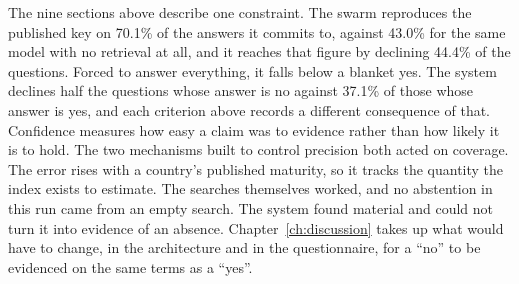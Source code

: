 The nine sections above describe one constraint. The swarm reproduces the published key on 70.1\% of the answers it commits to, against 43.0\% for the same model with no retrieval at all, and it reaches that figure by declining 44.4\% of the questions. Forced to answer everything, it falls below a blanket yes. The system declines half the questions whose answer is no against 37.1\% of those whose answer is yes, and each criterion above records a different consequence of that. Confidence measures how easy a claim was to evidence rather than how likely it is to hold. The two mechanisms built to control precision both acted on coverage. The error rises with a country's published maturity, so it tracks the quantity the index exists to estimate. The searches themselves worked, and no abstention in this run came from an empty search. The system found material and could not turn it into evidence of an absence. Chapter~\ref{ch:discussion} takes up what would have to change, in the architecture and in the questionnaire, for a ``no'' to be evidenced on the same terms as a ``yes''.
